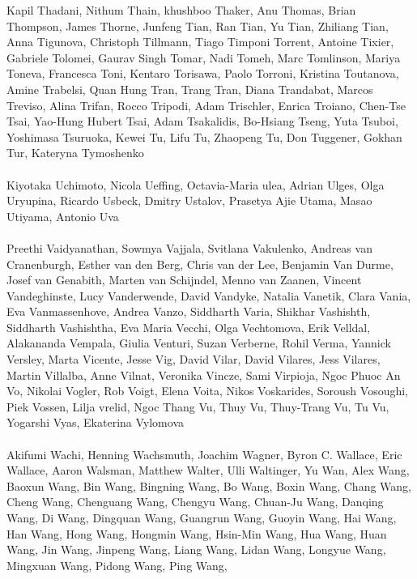 \documentclass[11pt]{article}
\begin{document}
\begin{description}[itemsep=4mm, style=nextline]
Kapil Thadani, 
Nithum Thain, 
khushboo Thaker, 
Anu Thomas, 
Brian Thompson, 
James Thorne, 
Junfeng Tian, 
Ran Tian, 
Yu Tian, 
Zhiliang Tian, 
Anna Tigunova, 
Christoph Tillmann, 
Tiago Timponi Torrent, 
Antoine Tixier, 
Gabriele Tolomei, 
Gaurav Singh Tomar, 
Nadi Tomeh, 
Marc Tomlinson, 
Mariya Toneva, 
Francesca Toni, 
Kentaro Torisawa, 
Paolo Torroni, 
Kristina Toutanova, 
Amine Trabelsi, 
Quan Hung Tran, 
Trang Tran, 
Diana Trandabat, 
Marcos Treviso, 
Alina Trifan, 
Rocco Tripodi, 
Adam Trischler, 
Enrica Troiano, 
Chen-Tse Tsai, 
Yao-Hung Hubert Tsai, 
Adam Tsakalidis, 
Bo-Hsiang Tseng, 
Yuta Tsuboi, 
Yoshimasa Tsuruoka, 
Kewei Tu, 
Lifu Tu, 
Zhaopeng Tu, 
Don Tuggener, 
Gokhan Tur, 
Kateryna Tymoshenko
\\
\\
Kiyotaka Uchimoto, 
Nicola Ueffing, 
Octavia-Maria ulea, 
Adrian Ulges, 
Olga Uryupina, 
Ricardo Usbeck, 
Dmitry Ustalov, 
Prasetya Ajie Utama, 
Masao Utiyama, 
Antonio Uva
\\
\\
Preethi Vaidyanathan, 
Sowmya Vajjala, 
Svitlana Vakulenko, 
Andreas van Cranenburgh, 
Esther van den Berg, 
Chris van der Lee, 
Benjamin Van Durme, 
Josef van Genabith, 
Marten van Schijndel, 
Menno van Zaanen, 
Vincent Vandeghinste, 
Lucy Vanderwende, 
David Vandyke, 
Natalia Vanetik, 
Clara Vania, 
Eva Vanmassenhove, 
Andrea Vanzo, 
Siddharth Varia, 
Shikhar Vashishth, 
Siddharth Vashishtha, 
Eva Maria Vecchi, 
Olga Vechtomova, 
Erik Velldal, 
Alakananda Vempala, 
Giulia Venturi, 
Suzan Verberne, 
Rohil Verma, 
Yannick Versley, 
Marta Vicente, 
Jesse Vig, 
David Vilar, 
David Vilares, 
Jess Vilares, 
Martin Villalba, 
Anne Vilnat, 
Veronika Vincze, 
Sami Virpioja, 
Ngoc Phuoc An Vo, 
Nikolai Vogler, 
Rob Voigt, 
Elena Voita, 
Nikos Voskarides, 
Soroush Vosoughi, 
Piek Vossen, 
Lilja vrelid, 
Ngoc Thang Vu, 
Thuy Vu, 
Thuy-Trang Vu, 
Tu Vu, 
Yogarshi Vyas, 
Ekaterina Vylomova
\\
\\
Akifumi Wachi, 
Henning Wachsmuth, 
Joachim Wagner, 
Byron C. Wallace, 
Eric Wallace, 
Aaron Walsman, 
Matthew Walter, 
Ulli Waltinger, 
Yu Wan, 
Alex Wang, 
Baoxun Wang, 
Bin Wang, 
Bingning Wang, 
Bo Wang, 
Boxin Wang, 
Chang Wang, 
Cheng Wang, 
Chenguang Wang, 
Chengyu Wang, 
Chuan-Ju Wang, 
Danqing Wang, 
Di Wang, 
Dingquan Wang, 
Guangrun Wang, 
Guoyin Wang, 
Hai Wang, 
Han Wang, 
Hong Wang, 
Hongmin Wang, 
Hsin-Min Wang, 
Hua Wang, 
Huan Wang, 
Jin Wang, 
Jinpeng Wang, 
Liang Wang, 
Lidan Wang, 
Longyue Wang, 
Mingxuan Wang, 
Pidong Wang, 
Ping Wang, 

\end{description}
\end{document}
